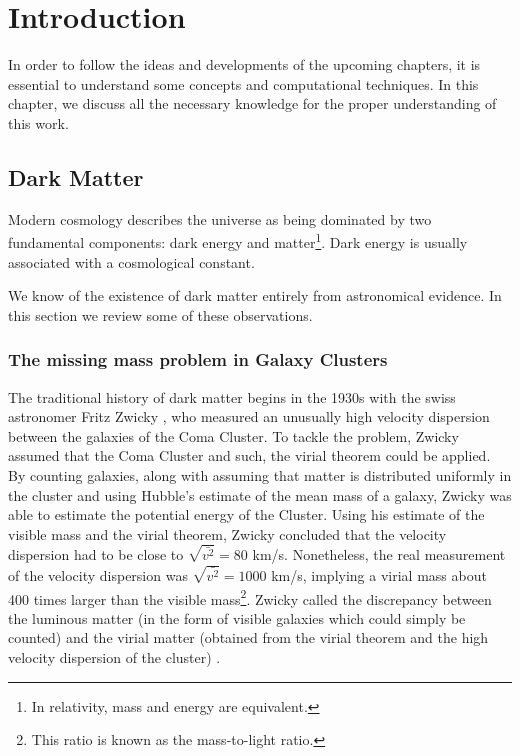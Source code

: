 \setcounter{page}{1}%
\belowdisplayshortskip=0pt
\renewcommand{\thepage}{\arabic{page}}%
\newpage
\chapter{Introduction}
In order to follow the ideas and developments of the upcoming chapters, it is essential to understand some concepts and computational techniques.
In this chapter, we discuss all the necessary knowledge for the proper understanding of this work.
\section{Dark Matter}
Modern cosmology describes the universe as being dominated by two fundamental components: dark energy and matter\footnote{In relativity, mass and energy are equivalent.}.
Dark energy is usually associated with a cosmological constant.

We know of the existence of dark matter entirely from astronomical evidence. In this section we review some of these observations.

\subsection{The missing mass problem in Galaxy Clusters}
The traditional history of dark matter begins in the 1930s with the swiss astronomer Fritz Zwicky\cite{aHistory} \cite{tasiCline}, who measured an unusually high velocity dispersion between the galaxies of the Coma Cluster.
To tackle the problem, Zwicky assumed that the Coma Cluster  \cite{englishZwicky} and such, the virial theorem could be applied.
By counting galaxies, along with assuming that matter is distributed uniformly in the cluster and using Hubble's estimate of the mean mass of a galaxy, Zwicky was able to estimate the potential energy of the Cluster.
Using his estimate of the visible mass and the virial theorem, Zwicky concluded that the velocity dispersion had to be close to $\sqrt{\bar{v^2}} = 80$ km/s.
Nonetheless, the real measurement of the velocity dispersion was $\sqrt{\bar{v^2}} = 1000$ km/s, implying a virial mass about 400 times larger than the visible mass\footnote{This ratio is known as the mass-to-light ratio.}.
Zwicky called the discrepancy between the luminous matter (in the form of visible galaxies which could simply be counted) and the virial matter (obtained from the virial theorem and the high velocity dispersion of the cluster) .

